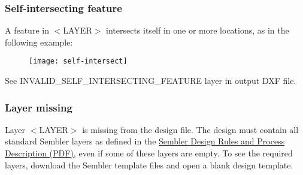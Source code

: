 \documentclass[twoside]{article}
\begin{document}
\subsubsection{Self-intersecting feature}
\par A feature in $<$LAYER$>$ intersects itself in one or more locations, as in the following example:
\begin{figure}[!ht]
\centering
\texttt{[image: self-intersect]}
\end{figure}
\par See INVALID\_SELF\_INTERSECTING\_FEATURE layer in output DXF file.
\subsubsection{Layer missing}
\par Layer $<$LAYER$>$ is missing from the design file. The design must contain all standard Sembler layers as defined in the \href{https://sembler.draper.com/files/sembler_process_rules.pdf}{Sembler Design Rules and Process Description (PDF)}, even if some of these layers are empty. To see the required layers, download the Sembler template files and open a blank design template.
\end{document}
